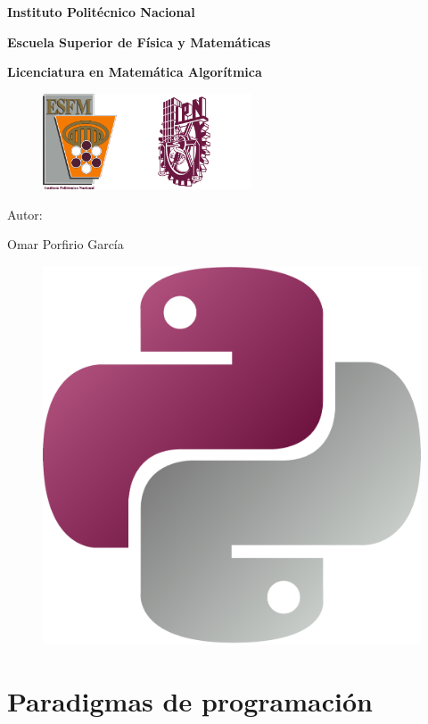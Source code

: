 

	\lstset{style = mystyle}
	\begin{titlepage}
		\centering
		
		{\bfseries\LARGE Instituto Politécnico Nacional\par}
		
		{\bfseries\Large Escuela Superior de Física y Matemáticas\par}
		
		{\bfseries\Large Licenciatura en Matemática Algorítmica\par}
		\vspace{0.5cm}
		{
			\begin{figure}[h]
				\begin{center}
					\includegraphics[width=2.2cm]{Images/Escudos/ESCUDO_ESFM.png}\includegraphics[width=4cm]{Images/Escudos/ipn2.png}\par
				\end{center}
			\end{figure}
		}
		\vspace{1cm}
		{\Huge \hwname\par}
		\vspace{1.5cm}
		{\Large Autor:\par}
		{\Large Omar Porfirio García\par}
		\vspace{1cm}
		\begin{figure}[h]
			\centering
			\includegraphics[width=0.5\linewidth]{Images/Escudos/Python.pdf}
		\end{figure}
	\end{titlepage}
	\tableofcontents		%
	\lstlistoflistings		%
	\newpage
	
	\newpage
	\section{Paradigmas de programación}
	
	\newpage
	

